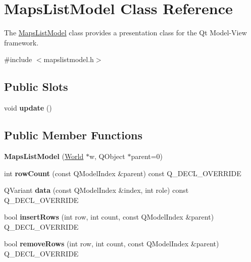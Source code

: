 \hypertarget{class_maps_list_model}{\section{\-Maps\-List\-Model \-Class \-Reference}
\label{class_maps_list_model}
}


\-The \hyperlink{class_maps_list_model}{\-Maps\-List\-Model} class provides a presentation class for the \-Qt \-Model-\/\-View framework.  




{\ttfamily \#include $<$mapslistmodel.\-h$>$}

\subsection*{\-Public \-Slots}
\begin{DoxyCompactItemize}
\item 
\hypertarget{class_maps_list_model_aa08107d25efb1fd559d054751f148a3f}{void {\bfseries update} ()}\label{class_maps_list_model_aa08107d25efb1fd559d054751f148a3f}

\end{DoxyCompactItemize}
\subsection*{\-Public \-Member \-Functions}
\begin{DoxyCompactItemize}
\item 
\hypertarget{class_maps_list_model_a217db37a921ecca05b082dee26a5272a}{{\bfseries \-Maps\-List\-Model} (\hyperlink{class_world}{\-World} $\ast$w, \-Q\-Object $\ast$parent=0)}\label{class_maps_list_model_a217db37a921ecca05b082dee26a5272a}

\item 
\hypertarget{class_maps_list_model_acec046632c59d580ca1915e70a8cec14}{int {\bfseries row\-Count} (const \-Q\-Model\-Index \&parent) const \-Q\-\_\-\-D\-E\-C\-L\-\_\-\-O\-V\-E\-R\-R\-I\-D\-E}\label{class_maps_list_model_acec046632c59d580ca1915e70a8cec14}

\item 
\hypertarget{class_maps_list_model_a3cab7c81a30a41d825bcc7e82d509ce3}{\-Q\-Variant {\bfseries data} (const \-Q\-Model\-Index \&index, int role) const \-Q\-\_\-\-D\-E\-C\-L\-\_\-\-O\-V\-E\-R\-R\-I\-D\-E}\label{class_maps_list_model_a3cab7c81a30a41d825bcc7e82d509ce3}

\item 
\hypertarget{class_maps_list_model_aafdc9fae57291d36d3c6b2754a1bc3a4}{bool {\bfseries insert\-Rows} (int row, int count, const \-Q\-Model\-Index \&parent) \-Q\-\_\-\-D\-E\-C\-L\-\_\-\-O\-V\-E\-R\-R\-I\-D\-E}\label{class_maps_list_model_aafdc9fae57291d36d3c6b2754a1bc3a4}

\item 
\hypertarget{class_maps_list_model_a3877cf5da4ec1004e8b867a7fa3599e9}{bool {\bfseries remove\-Rows} (int row, int count, const \-Q\-Model\-Index \&parent) \-Q\-\_\-\-D\-E\-C\-L\-\_\-\-O\-V\-E\-R\-R\-I\-D\-E}\label{class_maps_list_model_a3877cf5da4ec1004e8b867a7fa3599e9}

\end{DoxyCompactItemize}


